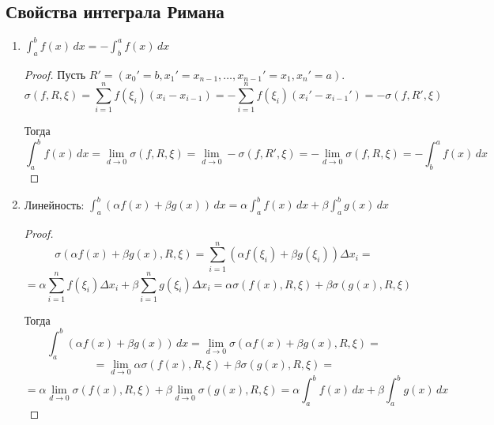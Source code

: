 \subsection{Свойства интеграла Римана}
\begin{enumerate}
	\item \label{st:b_a_integral} $\displaystyle \int_a^b f(x)\,dx = -\int_b^a f(x)\,dx$
	\begin{proof}
	Пусть $R' = (x_0' = b, x_1' = x_{n-1}, \ldots, x_{n-1}' = x_1, x_n' = a)$.
	\begin{equation*}
	\sigma(f, R, \xi) =
	\sum_{i=1}^n f(\xi_i) (x_i - x_{i-1}) =
	-\sum_{i=1}^n f(\xi_i) (x_i' - x_{i-1}') =
	-\sigma(f, R', \xi)
	\end{equation*}
	
	Тогда
	\begin{equation*}
	\int_a^b f(x)\,dx =
	\lim_{d \to 0} \sigma(f, R, \xi) =
	\lim_{d \to 0} -\sigma(f, R', \xi) =
	-\lim_{d \to 0} \sigma(f, R, \xi) =
	-\int_b^a f(x)\,dx
	\end{equation*}
	\end{proof}
	
	\item Линейность: $\displaystyle \int_a^b (\alpha f(x) + \beta g(x))\,dx = 
	\alpha \int_a^b f(x)\,dx + \beta \int_a^b g(x)\,dx$
	\begin{proof}
	\begin{equation*}
	\sigma(\alpha f(x) + \beta g(x), R, \xi) =
	\sum_{i=1}^n (\alpha f(\xi_i) + \beta g(\xi_i)) \Delta x_i =
	\end{equation*}
	\begin{equation*}
	= \alpha \sum_{i=1}^n f(\xi_i) \Delta x_i + \beta \sum_{i=1}^n g(\xi_i) \Delta x_i =
	\alpha \sigma(f(x), R, \xi) + \beta \sigma(g(x), R, \xi)
	\end{equation*}
	
	Тогда
	\begin{equation*}
	\int_a^b (\alpha f(x) + \beta g(x))\,dx =
	\lim_{d \to 0} \sigma(\alpha f(x) + \beta g(x), R, \xi) =
	\end{equation*}
	\begin{equation*}
	= \lim_{d \to 0} \alpha \sigma(f(x), R, \xi) + \beta \sigma(g(x), R, \xi) =
	\end{equation*}
	\begin{equation*}
	= \alpha \lim_{d \to 0} \sigma(f(x), R, \xi) + \beta \lim_{d \to 0} \sigma(g(x), R, \xi) =
	\alpha \int_a^b f(x)\,dx + \beta \int_a^b g(x)\,dx
	\end{equation*}
	\end{proof}
	

\end{enumerate}
